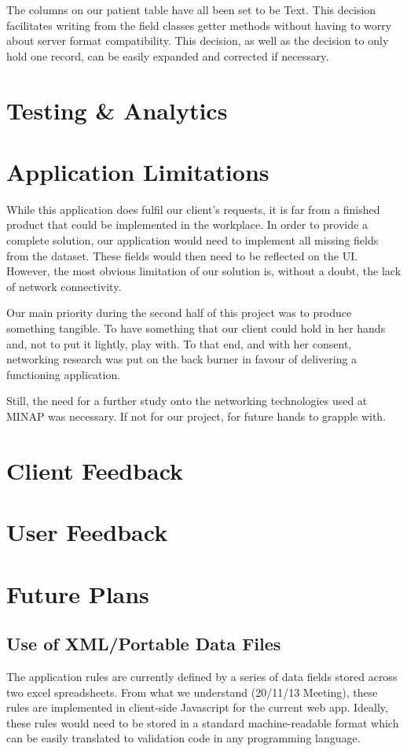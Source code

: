 \documentclass[12pt,a4paper,oneside,titlepage]{article}
\begin{document}
The columns on our patient table have all been set to be Text. This decision facilitates writing from the field classes getter methods without having to worry about server format compatibility. This decision, as well as the decision to only hold one record, can be easily expanded and corrected if necessary.

\newpage
\section{Testing \& Analytics}

\newpage
\section{Application Limitations}
While this application does fulfil our client's requests, it is far from a finished product that could be implemented in the workplace. In order to provide a complete solution, our application would need to implement all missing fields from the dataset. These fields would then need to be reflected on the UI. However, the most obvious limitation of our solution is, without a doubt, the lack of network connectivity.

Our main priority during the second half of this project was to produce something tangible. To have something that our client could hold in her hands and, not to put it lightly, play with. To that end, and with her consent, networking research was put on the back burner in favour of delivering a functioning application.

Still, the need for a further study onto the networking technologies used at MINAP was necessary. If not for our project, for future hands to grapple with.

\newpage
\section{Client Feedback}

\newpage
\section{User Feedback} 

\newpage
\section{Future Plans}
\subsection{Use of XML/Portable Data Files}
The application rules are currently defined by a series of data fields stored across two excel spreadsheets. From what we understand (20/11/13 Meeting), these rules are implemented in client-side Javascript for the current web app. Ideally, these rules would need to be stored in a standard machine-readable format which can be easily translated to validation code in any programming language.
\end{document}
